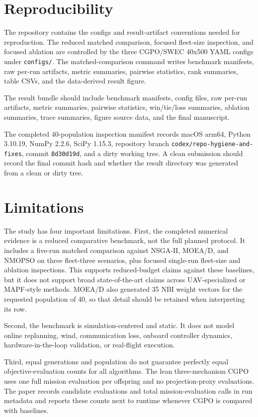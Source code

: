 \documentclass[a4paper,fleqn]{cas-dc}
\begin{document}
\section{Reproducibility}
\label{sec:reproducibility}

The repository contains the configs and result-artifact conventions needed for reproduction. The reduced matched comparison, focused fleet-size inspection, and focused ablation are controlled by the three CGPO/SWEC 40x500 YAML configs under \texttt{configs/}. The matched-comparison command writes benchmark manifests, raw per-run artifacts, metric summaries, pairwise statistics, rank summaries, table CSVs, and the data-derived result figure.

The result bundle should include benchmark manifests, config files, raw per-run artifacts, metric summaries, pairwise statistics, win/tie/loss summaries, ablation summaries, trace summaries, figure source data, and the final manuscript.

The completed 40-population inspection manifest records macOS arm64, Python 3.10.19, NumPy 2.2.6, SciPy 1.15.3, repository branch \texttt{codex/repo-hygiene-and-fixes}, commit \texttt{8d30d19d}, and a dirty working tree. A clean submission should record the final commit hash and whether the result directory was generated from a clean or dirty tree.

\section{Limitations}
\label{sec:limitations}

The study has four important limitations. First, the completed numerical evidence is a reduced comparative benchmark, not the full planned protocol. It includes a five-run matched comparison against NSGA-II, MOEA/D, and NMOPSO on three fleet-three scenarios, plus focused single-run fleet-size and ablation inspections. This supports reduced-budget claims against these baselines, but it does not support broad state-of-the-art claims across UAV-specialized or MAPF-style methods. MOEA/D also generated 35 NBI weight vectors for the requested population of 40, so that detail should be retained when interpreting its row.

Second, the benchmark is simulation-centered and static. It does not model online replanning, wind, communication loss, onboard controller dynamics, hardware-in-the-loop validation, or real-flight execution.

Third, equal generations and population do not guarantee perfectly equal objective-evaluation counts for all algorithms. The lean three-mechanism CGPO uses one full mission evaluation per offspring and no projection-proxy evaluations. The paper records candidate evaluations and total mission-evaluation calls in run metadata and reports these counts next to runtime whenever CGPO is compared with baselines.
\end{document}
